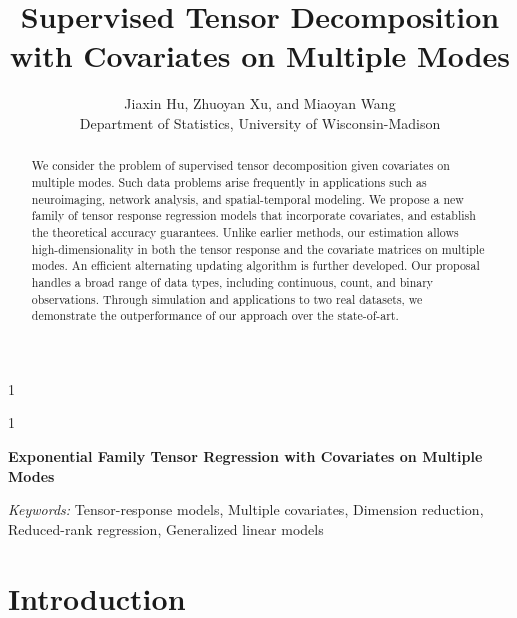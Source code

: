 \documentclass[12pt]{article}
\newcommand{\blind}{1}
\theoremstyle{plain}
\theoremstyle{definition}
\begin{document}
%

\def\spacingset#1{\renewcommand{\baselinestretch}%
{#1}\small\normalsize} \spacingset{1}



\blind
{
  \title{\bf Supervised Tensor Decomposition with Covariates on Multiple Modes}
  \author{Jiaxin Hu, Zhuoyan Xu, and Miaoyan Wang\\
    Department of Statistics, University of Wisconsin-Madison}
  \maketitle
} \fi

\blind
{
  \bigskip
  \bigskip
  \bigskip
  \begin{center}
    {\LARGE\bf Exponential Family Tensor Regression with Covariates on Multiple Modes}
\end{center}
  \medskip
} \fi

\bigskip
\begin{abstract}
We consider the problem of supervised tensor decomposition given covariates on multiple modes. Such data problems arise frequently in applications such as neuroimaging, network analysis, and spatial-temporal modeling. We propose a new family of tensor response regression models that incorporate covariates, and establish the theoretical accuracy guarantees. Unlike earlier methods, our estimation allows high-dimensionality in both the tensor response and the covariate matrices on multiple modes. An efficient alternating updating algorithm is further developed. Our proposal handles a broad range of data types, including continuous, count, and binary observations. Through simulation and applications to two real datasets, we demonstrate the outperformance of our approach over the state-of-art.
\end{abstract}

\noindent%
{\it Keywords:}  Tensor-response models, Multiple covariates, Dimension reduction, Reduced-rank regression, Generalized linear models 
\vfill

\newpage
\spacingset{1.5} %
\section{Introduction}
\label{sec:intro}
\end{document}
